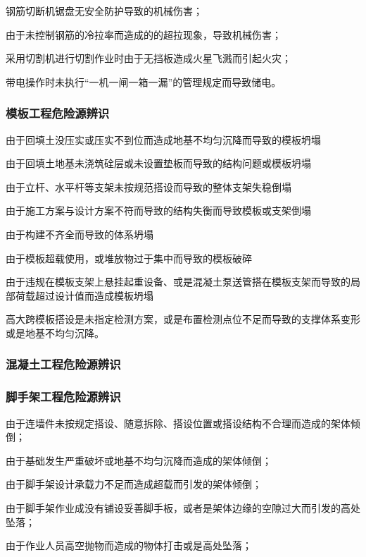  钢筋切断机锯盘无安全防护导致的机械伤害；

 由于未控制钢筋的冷拉率而造成的的超拉现象，导致机械伤害；

 采用切割机进行切割作业时由于无挡板造成火星飞溅而引起火灾；

 带电操作时未执行“一机一闸一箱一漏”的管理规定而导致储电。

\subsubsection{模板工程危险源辨识}

 由于回填土没压实或压实不到位而造成地基不均匀沉降而导致的模板坍塌

 由于回填土地基未浇筑硂层或未设置垫板而导致的结构问题或模板坍塌

 由于立杆、水平杆等支架未按规范搭设而导致的整体支架失稳倒塌

 由于施工方案与设计方案不符而导致的结构失衡而导致模板或支架倒塌

 由于构建不齐全而导致的体系坍塌

 由于模板超载使用，或堆放物过于集中而导致的模板破碎

 由于违规在模板支架上悬挂起重设备、或是混凝土泵送管搭在模板支架而导致的局部荷载超过设计值而造成模板坍塌

 高大跨模板搭设是未指定检测方案，或是布置检测点位不足而导致的支撑体系变形
或是地基不均匀沉降。



\subsubsection{混凝土工程危险源辨识}
\subsubsection{脚手架工程危险源辨识}

 由于连墙件未按规定搭设、随意拆除、搭设位置或搭设结构不合理而造成的架体倾倒；

 由于基础发生严重破坏或地基不均匀沉降而造成的架体倾倒；

 由于脚手架设计承载力不足而造成超载而引发的架体倾倒；

 由于脚手架作业成没有铺设妥善脚手板，或者是架体边缘的空隙过大而引发的高处坠落；

 由于作业人员高空抛物而造成的物体打击或是高处坠落；

